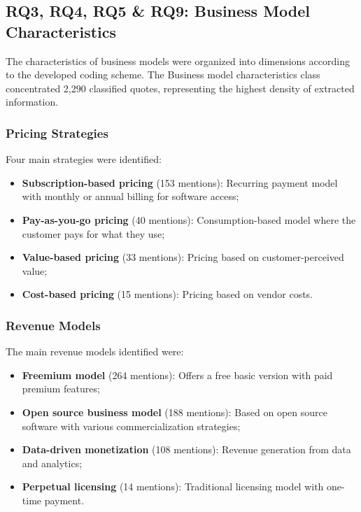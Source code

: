 \documentclass[journal]{IEEEtran}
\begin{document}
\subsection{RQ3, RQ4, RQ5 \& RQ9: Business Model Characteristics}

The characteristics of business models were organized into dimensions according to the developed coding scheme. The Business model characteristics class concentrated 2,290 classified quotes, representing the highest density of extracted information.

\subsubsection{Pricing Strategies}

Four main strategies were identified:
\begin{itemize}
    \item \textbf{Subscription-based pricing} (153 mentions): Recurring payment model with monthly or annual billing for software access;
    \item \textbf{Pay-as-you-go pricing} (40 mentions): Consumption-based model where the customer pays for what they use;
    \item \textbf{Value-based pricing} (33 mentions): Pricing based on customer-perceived value;
    \item \textbf{Cost-based pricing} (15 mentions): Pricing based on vendor costs.
\end{itemize}

\subsubsection{Revenue Models}

The main revenue models identified were:
\begin{itemize}
    \item \textbf{Freemium model} (264 mentions): Offers a free basic version with paid premium features;
    \item \textbf{Open source business model} (188 mentions): Based on open source software with various commercialization strategies;
    \item \textbf{Data-driven monetization} (108 mentions): Revenue generation from data and analytics;
    \item \textbf{Perpetual licensing} (14 mentions): Traditional licensing model with one-time payment.
\end{itemize}
\end{document}
